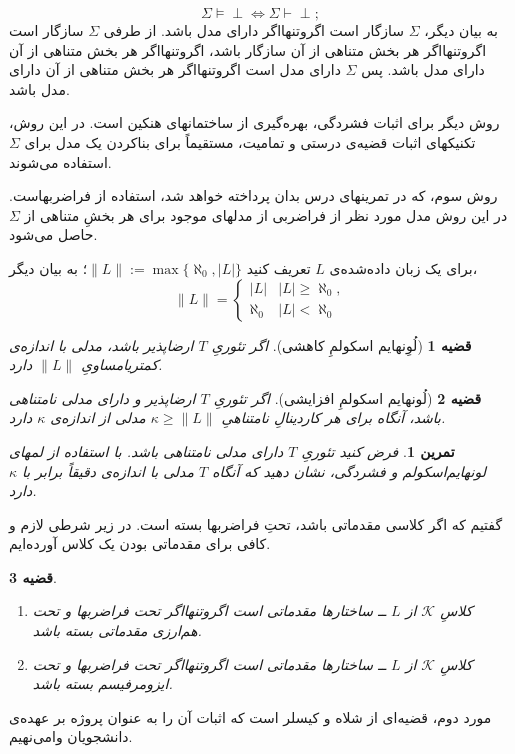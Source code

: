 \documentclass[12pt,a4paper]{report}
\theoremstyle{colorhead}
\newtheorem{thm}{قضیه}
\newtheorem{tam}{تمرین}
\begin{document}
\[
\Sigma\models \perp \Leftrightarrow \Sigma\vdash \perp;
\]
به بیان دیگر،
$\Sigma$
سازگار 
است اگروتنهااگر دارای مدل باشد.  از طرفی 
$\Sigma$
سازگار است 
اگروتنهااگر هر بخش متناهی از آن سازگار باشد، اگروتنهااگر هر بخش متناهی از آن دارای مدل باشد. پس 
$\Sigma$
دارای مدل است اگروتنهااگر هر بخش متناهی از آن دارای مدل باشد.
\par 
روش دیگر برای اثبات فشردگی، بهره‌گیری از ساختمانهای هنکین
 است.  در این روش، تکنیکهای اثبات قضیه‌ی درستی و تمامیت، مستقیماً برای بناکردن یک مدل برای
$\Sigma$
استفاده می‌شوند. 
\par 
روش سوم، که در تمرینهای درس بدان پرداخته خواهد شد، استفاده از فراضربهاست. در این روش مدل مورد نظر از فراضربی از
مدلهای موجود برای هر بخشِ متناهی 
از
$\Sigma$
حاصل می‌شود.
\par 
برای یک زبان داده‌شده‌ی 
$L$
تعریف 
کنید
$\|L\|:=\max\{\aleph_0,|L|\}$؛
به بیان دیگر،
\[
\|L\|=\begin{cases}
|L| & |L|\geq \aleph_0,
\\
\aleph_0 & |L|<\aleph_0
\end{cases}
\]
\begin{thm}[لُوِنهایم اسکولمِ کاهشی]
اگر تئوریِ
$T$
ارضاپذیر باشد،  مدلی با اندازه‌ی کمتریامساویِ
$\|L\|$
دارد. 
\end{thm}
\begin{thm}[لُونهایم اسکولمِ افزایشی]
اگر تئوریِ
$T$
ارضاپذیر 
و دارای مدلی نامتناهی باشد،
آنگاه برای هر کاردینالِ نامتناهیِ 
$\kappa\geq \|L\|$
مدلی از اندازه‌ی
$\kappa$
دارد. 
\end{thm}
\begin{tam}
فرض کنید تئوریِ
$T$
 دارای 
 مدلی نامتناهی باشد. با استفاده از لمهای لونهایم‌اسکولم و فشردگی، نشان دهید که 
 آنگاه 
 $T$
 مدلی با اندازه‌ی
دقیقاً
برابر با
$\kappa$
 دارد. 
\end{tam}
گفتیم که اگر کلاسی مقدماتی باشد، تحتِ فراضربها بسته است. در زیر شرطی لازم و کافی برای مقدماتی بودن یک کلاس آورده‌ایم.
\begin{thm}
\hfill
\begin{enumerate}
\item 
کلاسِ
$\mathcal{K}$
از
$L$  ــ‌
ساختارها مقدماتی است اگروتنهااگر تحت فراضربها و تحت هم‌ارزی مقدماتی بسته باشد.
\item 
کلاسِ
$\mathcal{K}$
از
$L$  ــ‌
ساختارها مقدماتی است اگروتنهااگر تحت فراضربها و تحت ایزومرفیسم بسته باشد.
\end{enumerate}
\end{thm}
مورد دوم، قضیه‌ای از شلاه و کیسلر 
است که اثبات آن را به عنوان پروژه بر عهده‌ی دانشجویان وامی‌نهیم. 
\end{document}

